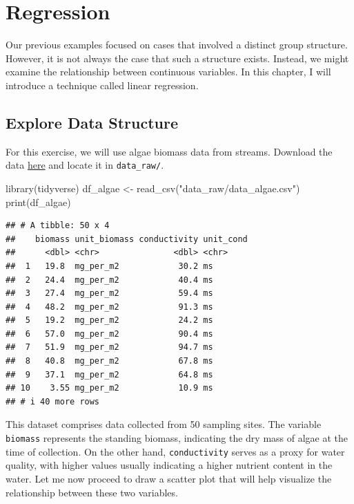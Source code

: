 \documentclass[
]{article}
\newenvironment{Shaded}{\begin{snugshade}}{\end{snugshade}}
\newcommand{\FunctionTok}[1]{\textcolor[rgb]{0.00,0.00,0.00}{#1}}
\newcommand{\NormalTok}[1]{#1}
\newcommand{\OtherTok}[1]{\textcolor[rgb]{0.56,0.35,0.01}{#1}}
\newcommand{\StringTok}[1]{\textcolor[rgb]{0.31,0.60,0.02}{#1}}
\begin{document}
\hypertarget{regression}{%
\section{Regression}\label{regression}}

Our previous examples focused on cases that involved a distinct group structure. However, it is not always the case that such a structure exists. Instead, we might examine the relationship between continuous variables. In this chapter, I will introduce a technique called linear regression.

\hypertarget{explore-data-structure-1}{%
\subsection{Explore Data Structure}\label{explore-data-structure-1}}

For this exercise, we will use algae biomass data from streams. Download the data \href{https://github.com/aterui/biostats/blob/master/data_raw/data_algae.csv}{here} and locate it in \texttt{data\_raw/}.

\begin{Shaded}
\begin{Highlighting}[]
\FunctionTok{library}\NormalTok{(tidyverse)}
\NormalTok{df\_algae }\OtherTok{\textless{}{-}} \FunctionTok{read\_csv}\NormalTok{(}\StringTok{"data\_raw/data\_algae.csv"}\NormalTok{)}
\FunctionTok{print}\NormalTok{(df\_algae)}
\end{Highlighting}
\end{Shaded}

\begin{verbatim}
## # A tibble: 50 x 4
##    biomass unit_biomass conductivity unit_cond
##      <dbl> <chr>               <dbl> <chr>    
##  1   19.8  mg_per_m2            30.2 ms       
##  2   24.4  mg_per_m2            40.4 ms       
##  3   27.4  mg_per_m2            59.4 ms       
##  4   48.2  mg_per_m2            91.3 ms       
##  5   19.2  mg_per_m2            24.2 ms       
##  6   57.0  mg_per_m2            90.4 ms       
##  7   51.9  mg_per_m2            94.7 ms       
##  8   40.8  mg_per_m2            67.8 ms       
##  9   37.1  mg_per_m2            64.8 ms       
## 10    3.55 mg_per_m2            10.9 ms       
## # i 40 more rows
\end{verbatim}

This dataset comprises data collected from 50 sampling sites. The variable \texttt{biomass} represents the standing biomass, indicating the dry mass of algae at the time of collection. On the other hand, \texttt{conductivity} serves as a proxy for water quality, with higher values usually indicating a higher nutrient content in the water. Let me now proceed to draw a scatter plot that will help visualize the relationship between these two variables.
\end{document}
